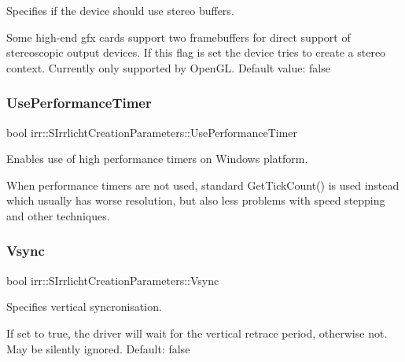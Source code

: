 Specifies if the device should use stereo buffers. 

Some high-\/end gfx cards support two framebuffers for direct support of stereoscopic output devices. If this flag is set the device tries to create a stereo context. Currently only supported by Open\+GL. Default value\+: false \mbox{\label{structirr_1_1SIrrlichtCreationParameters_a5bb2ea5e72eb07a049b1b7c707f405ef}} 
\subsubsection{\texorpdfstring{Use\+Performance\+Timer}{UsePerformanceTimer}}
{\footnotesize\ttfamily bool irr\+::\+S\+Irrlicht\+Creation\+Parameters\+::\+Use\+Performance\+Timer}



Enables use of high performance timers on Windows platform. 

When performance timers are not used, standard Get\+Tick\+Count() is used instead which usually has worse resolution, but also less problems with speed stepping and other techniques. \mbox{\label{structirr_1_1SIrrlichtCreationParameters_a33b07682f12db0d2c2c3a7bf74f64387}} 
\subsubsection{\texorpdfstring{Vsync}{Vsync}}
{\footnotesize\ttfamily bool irr\+::\+S\+Irrlicht\+Creation\+Parameters\+::\+Vsync}



Specifies vertical syncronisation. 

If set to true, the driver will wait for the vertical retrace period, otherwise not. May be silently ignored. Default\+: false \mbox{\label{structirr_1_1SIrrlichtCreationParameters_af287810d910a23f8f7db98cef87b6eae}} 
